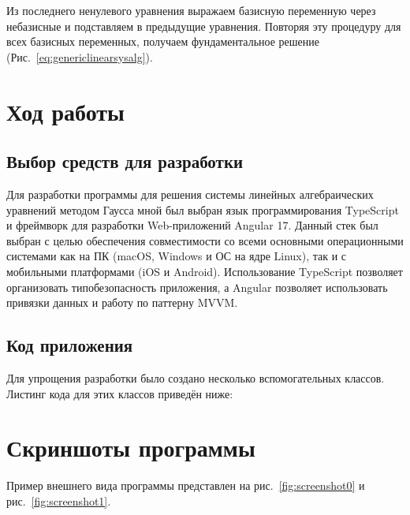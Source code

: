\documentclass[12pt,a4paper]{scrartcl}
\begin{document}
Из последнего ненулевого уравнения выражаем базисную переменную через небазисные и подставляем в предыдущие уравнения. Повторяя эту процедуру для всех базисных переменных, получаем фундаментальное решение (Рис.~\ref{eq:genericlinearsysalg}).


\section{Ход работы}
\label{sec:exp}

\subsection{Выбор средств для разработки}
\label{sec:exp:selection}
Для разработки программы для решения системы линейных алгебраических уравнений методом Гаусса мной был выбран язык программирования TypeScript и фреймворк для разработки Web-приложений Angular 17. Данный стек был выбран с целью обеспечения совместимости со всеми основными операционными системами как на ПК (macOS, Windows и ОС на ядре Linux), так и с мобильными платформами (iOS и Android). Использование TypeScript позволяет организовать типобезопасность приложения, а Angular позволяет использовать привязки данных и работу по паттерну MVVM.

\subsection{Код приложения}
\label{sec:exp:code}
Для упрощения разработки было создано несколько вспомогательных классов. Листинг кода для этих классов приведён ниже:






\section{Скриншоты программы}
\label{sec:program-shots}
Пример внешнего вида программы представлен на рис.~\ref{fig:screenshot0} и рис.~\ref{fig:screenshot1}.
\end{document}
